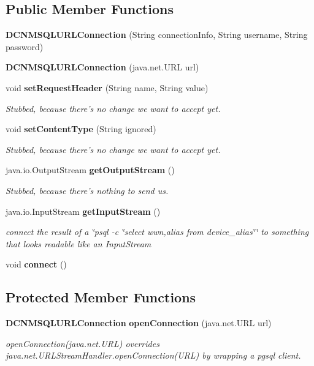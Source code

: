 \subsection*{Public Member Functions}
\begin{DoxyCompactItemize}
\item 
{\bf D\+C\+N\+M\+S\+Q\+L\+U\+R\+L\+Connection} (String connection\+Info, String username, String password)
\item 
{\bf D\+C\+N\+M\+S\+Q\+L\+U\+R\+L\+Connection} (java.\+net.\+U\+R\+L url)
\item 
void {\bf set\+Request\+Header} (String name, String value)
\begin{DoxyCompactList}\small\item\em Stubbed, because there's no change we want to accept yet. \end{DoxyCompactList}\item 
void {\bf set\+Content\+Type} (String ignored)
\begin{DoxyCompactList}\small\item\em Stubbed, because there's no change we want to accept yet. \end{DoxyCompactList}\item 
java.\+io.\+Output\+Stream {\bf get\+Output\+Stream} ()
\begin{DoxyCompactList}\small\item\em Stubbed, because there's nothing to send us. \end{DoxyCompactList}\item 
java.\+io.\+Input\+Stream {\bf get\+Input\+Stream} ()
\begin{DoxyCompactList}\small\item\em connect the result of a \char`\"{}psql -\/c \char`\"{}select wwn,alias from device\+\_\+alias\char`\"{}\char`\"{} to something that looks readable like an Input\+Stream \end{DoxyCompactList}\item 
void {\bf connect} ()
\end{DoxyCompactItemize}
\subsection*{Protected Member Functions}
\begin{DoxyCompactItemize}
\item 
{\bf D\+C\+N\+M\+S\+Q\+L\+U\+R\+L\+Connection} {\bf open\+Connection} (java.\+net.\+U\+R\+L url)
\begin{DoxyCompactList}\small\item\em open\+Connection(java.\+net.\+U\+R\+L) overrides java.\+net.\+U\+R\+L\+Stream\+Handler.\+open\+Connection(\+U\+R\+L) by wrapping a pgsql client. \end{DoxyCompactList}\end{DoxyCompactItemize}


